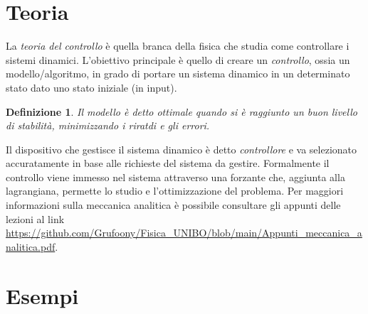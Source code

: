 \documentclass[12pt, a4paper]{book}
\theoremstyle{theorem}
\newtheorem{definition}{Definizione}[section]
\begin{document}
		\section{Teoria}
			La \emph{teoria del controllo} è quella branca della fisica che studia come controllare i sistemi dinamici.
			L'obiettivo principale è quello di creare un \emph{controllo}, ossia un modello/algoritmo, in grado di portare un sistema dinamico in un determinato stato dato uno stato iniziale (in input).
			\begin{definition}
				Il modello è detto ottimale quando si è raggiunto un buon livello di stabilità, minimizzando i riratdi e gli errori.
			\end{definition}
			Il dispositivo che gestisce il sistema dinamico è detto \emph{controllore} e va selezionato accuratamente in base alle richieste del sistema da gestire.
			Formalmente il controllo viene immesso nel sistema attraverso una forzante che, aggiunta alla lagrangiana, permette lo studio e l'ottimizzazione del problema.
			Per maggiori informazioni sulla meccanica analitica è possibile consultare gli appunti delle lezioni al link \url{https://github.com/Grufoony/Fisica_UNIBO/blob/main/Appunti_meccanica_analitica.pdf}.

		\section{Esempi}
\end{document}
